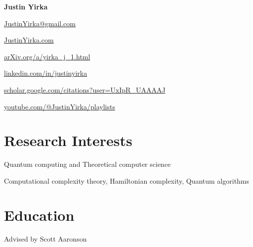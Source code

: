 \documentclass[11pt,letterpaper,serif]{moderncv}
\begin{document}
\pagestyle{normal}


\thispagestyle{firstpage}

\begin{center}
	{\LARGE\textbf{Justin Yirka}}

	\medskip{}

	\href{mailto:justinyirka@gmail.com}{JustinYirka@gmail.com}

	\medskip{}

	\href{https://www.justinyirka.com}{JustinYirka.com}


	\href{https://arxiv.org/a/yirka_j_1.html}{arXiv.org/a/yirka\_j\_1.html}

	\faLinkedin{} \href{https://www.linkedin.com/in/justinyirka/}{linkedin.com/in/justinyirka}

	\faGraduationCap{} \href{https://scholar.google.com/citations?user=UxIpR_UAAAAJ}{scholar.google.com/citations?user=UxIpR\_UAAAAJ}

	\faYoutube{}
	\href{https://www.youtube.com/playlist?list=PLHxZKg_X23Knp1fhJJI2u9HZP39uhbr7O}{youtube.com/@JustinYirka/playlists}
\end{center}


\setlength{\parskip}{0em}

\section{Research Interests}
Quantum computing and Theoretical computer science

\qquad Computational complexity theory, Hamiltonian complexity, Quantum algorithms


\section{Education}


{
	\normalsize
	\begin{adjustwidth}{.25in}{}
		Advised by Scott Aaronson
	\end{adjustwidth}
}
\end{document}
